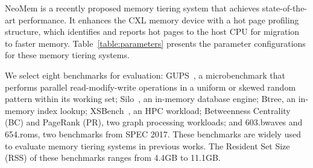 NeoMem is a recently proposed memory tiering system that achieves state-of-the-art performance. It enhances the CXL memory device with a hot page profiling structure, which identifies and reports hot pages to the host CPU for migration to faster memory.
Table~\ref{table:parameters} presents the parameter configurations for these memory tiering systems.




We select eight benchmarks for evaluation: GUPS~\cite{gups}, a microbenchmark that performs parallel read-modify-write operations in a uniform or skewed random pattern within its working set; 
Silo~\cite{silo}, an in-memory database engine; 
Btree, an in-memory index lookup; 
XSBench~\cite{xsbench}, an HPC workload; 
Betweenness Centrality (BC) and PageRank (PR)\cite{gapbs}, two graph processing workloads;
and 603.bwaves and 654.roms, two benchmarks from SPEC 2017.
These benchmarks are widely used to evaluate memory tiering systems in previous works\cite{hemem_sosp21, memtis_sosp23, neomem}. 
The Resident Set Size (RSS) of these benchmarks ranges from 4.4GB to 11.1GB. 


